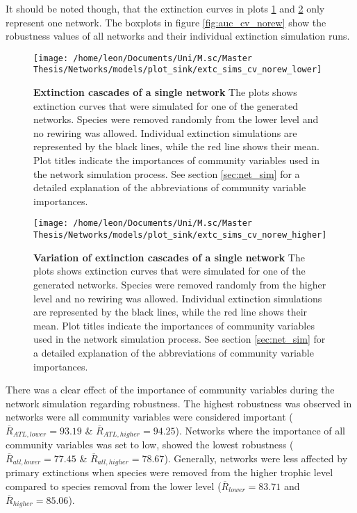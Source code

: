 \documentclass[12pt,a4paper]{article}
\begin{document}

It should be noted though, that the extinction curves in plots \ref{fig:extc_cv_norew_lower} and \ref{fig:extc_cv_norew_higher} only represent one network. The boxplots in figure \ref{fig:auc_cv_norew} show the robustness values of all networks and their individual extinction simulation runs.
\begin{figure}[H]
	 \texttt{[image: /home/leon/Documents/Uni/M.sc/Master Thesis/Networks/models/plot\_sink/extc\_sims\_cv\_norew\_lower]}
	 \caption{\textbf{Extinction cascades of a single network} The plots shows extinction curves that were simulated for one of the generated networks. Species were removed randomly from the lower level and no rewiring was allowed. Individual extinction simulations are represented by the black lines, while the red line shows their mean. Plot titles indicate the importances of community variables used in the network simulation process. See section \ref{sec:net_sim} for a detailed explanation of the abbreviations of community variable importances.}
	 \label{fig:extc_cv_norew_lower}
\end{figure}


\begin{figure}[H]
	 \texttt{[image: /home/leon/Documents/Uni/M.sc/Master Thesis/Networks/models/plot\_sink/extc\_sims\_cv\_norew\_higher]}
	 \caption{\textbf{Variation of extinction cascades of a single network} The plots shows extinction curves that were simulated for one of the generated networks. Species were removed randomly from the higher level and no rewiring was allowed. Individual extinction simulations are represented by the black lines, while the red line shows their mean. Plot titles indicate the importances of community variables used in the network simulation process. See section \ref{sec:net_sim} for a detailed explanation of the abbreviations of community variable importances.}
	 \label{fig:extc_cv_norew_higher}
\end{figure}

There was a clear effect of the importance of community variables during the network simulation regarding robustness. The highest robustness was observed in networks were all community variables were considered important ($\overline{R}_{ATL, lower} = 93.19$ \& $\overline{R}_{ATL, higher} = 94.25$). Networks where the importance of all community variables was set to low, showed the lowest robustness ($\overline{R}_{atl, lower} = 77.45$ \& $\overline{R}_{atl, higher} = 78.67$). Generally, networks were less affected by primary extinctions when species were removed from the higher trophic level compared to species removal from the lower level ($\overline{R}_{lower} = 83.71 $ and $\overline{R}_{higher} = 85.06$). \par
\end{document}
